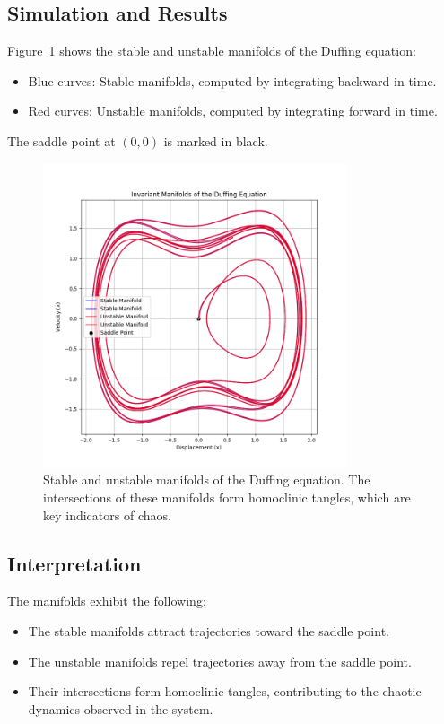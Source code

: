\documentclass[11pt]{article}
\begin{document}
\subsection*{Simulation and Results}
Figure~\ref{fig:invariant_manifolds} shows the stable and unstable manifolds of the Duffing equation:
\begin{itemize}
    \item Blue curves: Stable manifolds, computed by integrating backward in time.
    \item Red curves: Unstable manifolds, computed by integrating forward in time.
\end{itemize}
The saddle point at \( (0, 0) \) is marked in black.

\begin{figure}[h!]
    \centering
    \includegraphics[width=0.8\textwidth]{invariant_manifolds.png}
    \caption{Stable and unstable manifolds of the Duffing equation. The intersections of these manifolds form homoclinic tangles, which are key indicators of chaos.}
    \label{fig:invariant_manifolds}
\end{figure}

\subsection*{Interpretation}
The manifolds exhibit the following:
\begin{itemize}
    \item The stable manifolds attract trajectories toward the saddle point.
    \item The unstable manifolds repel trajectories away from the saddle point.
    \item Their intersections form homoclinic tangles, contributing to the chaotic dynamics observed in the system.
\end{itemize}
\end{document}
